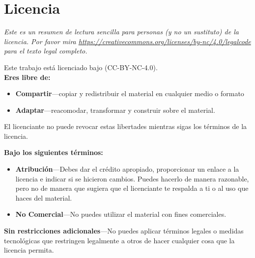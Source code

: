 \chapter{Licencia}\label{s:license}

{\setlength{\parindent}{0em}

\emph{
  Este es un resumen de lectura sencilla para personas (y no un sustituto) de la licencia.
  Por favor mira \url{https://creativecommons.org/licenses/by-nc/4.0/legalcode} para el texto legal completo.
}

\vspace{\baselineskip}

\noindent
Este trabajo est\'a licenciado bajo 
(CC-BY-NC-4.0).\\

\noindent
\textbf{Eres libre de:}

\begin{itemize}
\item
  \textbf{Compartir}---copiar y redistribuir el material en cualquier medio o
  formato
\item
  \textbf{Adaptar}---reacomodar, transformar y construir sobre el material.
\end{itemize}

El licenciante no puede revocar estas libertades mientras sigas los
t\'erminos de la licencia.

\vspace{\baselineskip}

\textbf{Bajo los siguientes t\'erminos:}

\begin{itemize}
\item
  \textbf{Atribuci\'on}---Debes dar el cr\'edito apropiado, proporcionar un enlace
  a la licencia e indicar si se hicieron cambios. Puedes hacerlo de manera 
  razonable, pero no de manera que sugiera que el licenciante te respalda 
  a ti o al uso que haces del material. \\
\item
  \textbf{No Comercial}---No puedes utilizar el material con fines comerciales.
\end{itemize}

\textbf{Sin restricciones adicionales}---No puedes aplicar t\'erminos legales o
medidas tecnol\'ogicas que restringen legalmente a otros de hacer cualquier cosa
que la licencia permita.

\vspace{\baselineskip}

}
